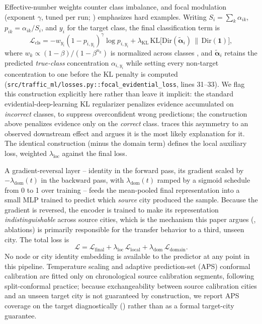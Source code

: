 Effective-number weights \citep{cui2019effectivenumber} counter class imbalance, and focal
modulation (exponent $\gamma$, tuned per run; ) emphasizes hard examples.
Writing
$S_i=\sum_k\alpha_{ik}$, $p_{ik}=\alpha_{ik}/S_i$, and $y_i$ for the target class, the final
classification term is
\begin{equation}
  \mathcal{L}_{\mathrm{cls}} = -w_{y_i}(1-p_{i,y_i})^\gamma \log p_{i,y_i}
    + \lambda_{\mathrm{KL}}\, \mathrm{KL}\!\big[\mathrm{Dir}(\tilde{\boldsymbol\alpha}_i)
    \,\|\, \mathrm{Dir}(\mathbf{1})\big],
  \label{eq:classification-loss}
\end{equation}
where $w_k \propto (1-\beta)/(1-\beta^{n_k})$ is normalized across classes
\citep{cui2019effectivenumber}, and $\tilde{\boldsymbol\alpha}_i$ retains the predicted
\emph{true-class} concentration $\alpha_{i,y_i}$ while setting every non-target concentration to
one before the KL penalty is computed (\texttt{src/traffic\_ml/losses.py::focal\_evidential\_loss},
lines 31--33). We flag this construction explicitly here rather than leave it implicit: the
standard evidential-deep-learning KL regularizer \citep{sensoy2018evidential} penalizes evidence
accumulated on \emph{incorrect} classes, to suppress overconfident wrong predictions; the
construction above penalizes evidence only on the \emph{correct} class.  traces
this asymmetry to an observed downstream effect and argues it is the most likely explanation for it.
The identical construction (minus the domain term) defines the local auxiliary loss, weighted
$\lambda_{\mathrm{loc}}$ against the final loss.

A gradient-reversal layer \citep{ganin2015dann} -- identity in the forward pass, its gradient
scaled by $-\lambda_{\mathrm{dom}}(t)$ in the backward pass, with $\lambda_{\mathrm{dom}}(t)$ ramped
by a sigmoid schedule from 0 to 1 over training -- feeds the mean-pooled final representation into a
small MLP trained to predict which \emph{source} city produced the sample. Because the gradient is
reversed, the encoder is trained to make its representation \emph{indistinguishable} across source
cities, which is the mechanism this paper argues (, ablations) is primarily
responsible for the transfer behavior to a third, unseen city. The total loss is
\begin{equation}
  \mathcal{L} = \mathcal{L}_{\mathrm{final}} + \lambda_{\mathrm{loc}}\,\mathcal{L}_{\mathrm{local}}
  + \lambda_{\mathrm{dom}}\,\mathcal{L}_{\mathrm{domain}}.
  \label{eq:total-loss}
\end{equation}
No node or city identity embedding is available to the predictor at any point in this pipeline.
Temperature scaling and adaptive prediction-set (APS) conformal calibration
\citep{angelopoulos2021gentle} are fitted only on chronological source calibration segments,
following split-conformal practice; because exchangeability between source calibration cities and
an unseen target city is not guaranteed by construction, we report APS coverage on the target
diagnostically () rather than as a formal target-city guarantee.
